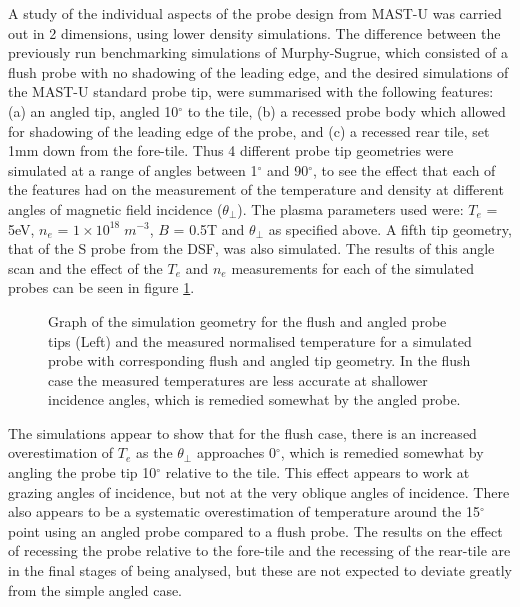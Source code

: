 \documentclass[a4paper, 12pt]{article} %
\begin{document}
	A study of the individual aspects of the probe design from MAST-U was carried out in 2 dimensions, using lower density simulations. 
	The difference between the previously run benchmarking simulations of Murphy-Sugrue, which consisted of a flush probe with no shadowing of the leading edge, and the desired simulations of the MAST-U standard probe tip, were summarised with the following features: (a) an angled tip, angled 10$^{\circ}$ to the tile, (b) a recessed probe body which allowed for shadowing of the leading edge of the probe, and (c) a recessed rear tile, set 1mm down from the fore-tile.  
	Thus 4 different probe tip geometries were simulated at a range of angles between 1$^{\circ}$ and 90$^{\circ}$, to see the effect that each of the features had on the measurement of the temperature and density at different angles of magnetic field incidence ($\theta_{\perp}$).
	The plasma parameters used were: $T_e$ = 5eV, $n_e$ = $1 \times 10^{18} \; m^{-3}$, $B$ = 0.5T and $\theta_{\perp}$ as specified above. 
	A fifth tip geometry, that of the S probe from the DSF, was also simulated. 
	The results of this angle scan and the effect of the $T_e$ and $n_e$ measurements for each of the simulated probes can be seen in figure \ref{fig:sim-incidence-angle}.
	\begin{figure}[!tb]
		\vspace{-0pt}
		\caption{
			Graph of the simulation geometry for the flush and angled probe tips (Left) and the measured normalised temperature for a simulated probe with corresponding flush and angled tip geometry. 
			In the flush case the measured temperatures are less accurate at shallower incidence angles, which is remedied somewhat by the angled probe.
			}
		\label{fig:sim-incidence-angle}
		\vspace{-10pt}
	\end{figure}
	
	The simulations appear to show that for the flush case, there is an increased overestimation of $T_e$ as the $\theta_{\perp}$ approaches 0$^{\circ}$, which is remedied somewhat by angling the probe tip 10$^{\circ}$ relative to the tile. 
	This effect appears to work at grazing angles of incidence, but not at the very oblique angles of incidence.
	There also appears to be a systematic overestimation of temperature around the 15$^{\circ}$ point using an angled probe compared to a flush probe. 
	The results on the effect of recessing the probe relative to the fore-tile and the recessing of the rear-tile are in the final stages of being analysed, but these are not expected to deviate greatly from the simple angled case.
	
\end{document}
